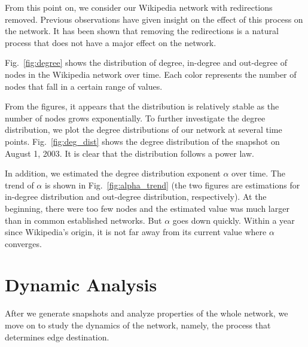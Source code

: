 \documentclass[10pt,twocolumn]{article}
\begin{document}
From this point on, we consider our Wikipedia network with redirections removed. Previous observations have given insight on the effect of this process on the network. It has been shown that removing the redirections is a natural process that does not have a major effect on the network.

Fig.~\ref{fig:degree} shows the distribution of degree, in-degree and out-degree of nodes in the Wikipedia network over time. Each color represents the number of nodes that fall in a certain range of values. 

From the figures, it appears that the distribution is relatively stable as the number of nodes grows exponentially. To further investigate the degree distribution, we plot the degree distributions of our network at several time points. Fig.~\ref{fig:deg_dist} shows the degree distribution of the snapshot on August 1, 2003. It is clear that the distribution follows a power law. 

In addition, we estimated the degree distribution exponent $\alpha$ over time. The trend of $\alpha$ is shown in Fig.~\ref{fig:alpha_trend} (the two figures are estimations for in-degree distribution and out-degree distribution, respectively). At the beginning, there were too few nodes and the estimated value was much larger than in common established networks. But $\alpha$ goes down quickly. Within a year since Wikipedia's origin, it is not far away from its current value where $\alpha$ converges.

\section{Dynamic Analysis}
After we generate snapshots and analyze properties of the whole network, we move on to study the dynamics of the network, namely, the process that determines edge destination.
\end{document}
